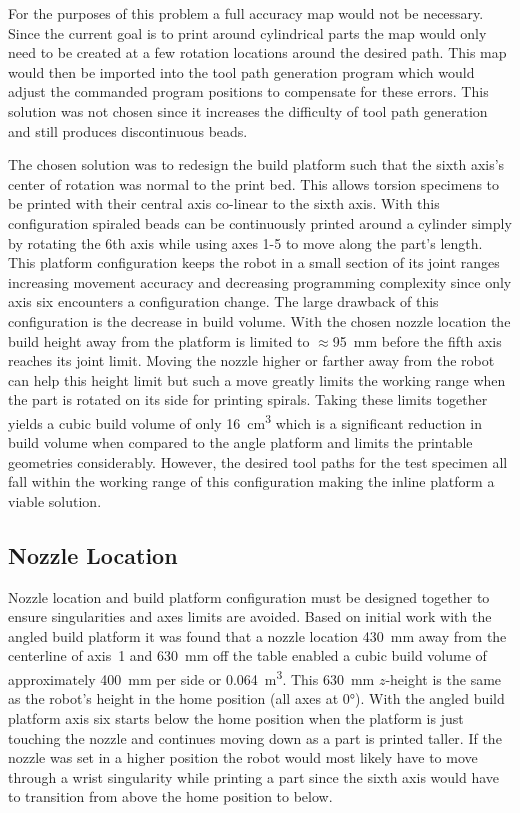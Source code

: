 \documentclass[main.tex]{subfiles}
\begin{document}
For the purposes of this problem a full accuracy map would not be necessary.
Since the current goal is to print around cylindrical parts the map would only need to be created at a few rotation locations around the desired path.
This map would then be imported into the tool path generation program which would adjust the commanded program positions to compensate for these errors.
This solution was not chosen since it increases the difficulty of tool path generation and still produces discontinuous beads.

The chosen solution was to redesign the build platform such that the sixth axis's center of rotation was normal to the print bed.
This allows torsion specimens to be printed with their central axis co-linear to the sixth axis.
With this configuration spiraled beads can be continuously printed around a cylinder simply by rotating the 6th axis while using axes 1-5 to move along the part's length.
This platform configuration keeps the robot in a small section of its joint ranges increasing movement accuracy and decreasing programming complexity since only axis six encounters a configuration change.
The large drawback of this configuration is the decrease in build volume.
With the chosen nozzle location the build height away from the platform is limited to $\approx$\SI{95}{mm} before the fifth axis reaches its joint limit.
Moving the nozzle higher or farther away from the robot can help this height limit but such a move greatly limits the working range when the part is rotated on its side for printing spirals.
Taking these limits together yields a cubic build volume of only \SI{16}{cm^3} which is a significant reduction in build volume when compared to the angle platform and limits the printable geometries considerably.
However, the desired tool paths for the test specimen all fall within the working range of this configuration making the inline platform a viable solution.

\subsection{Nozzle Location}
Nozzle location and build platform configuration must be designed together to ensure singularities and axes limits are avoided.
Based on initial work with the angled build platform it was found that a nozzle location \SI{430}{mm} away from the centerline of axis~1 and \SI{630}{mm} off the table enabled a cubic build volume of approximately \SI{400}{mm} per side or \SI{0.064}{m^3}.
This \SI{630}{mm} $z$\nobreakdash-height is the same as the robot's height in the home position (all axes at \ang{0}).
With the angled build platform axis six starts below the home position when the platform is just touching the nozzle and continues moving down as a part is printed taller.
If the nozzle was set in a higher position the robot would most likely have to move through a wrist singularity while printing a part since the sixth axis would have to transition from above the home position to below.
\end{document}
